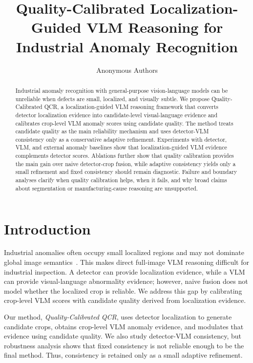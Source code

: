 \documentclass[10pt]{article}
\title{Quality-Calibrated Localization-Guided VLM Reasoning for Industrial Anomaly Recognition}
\author{Anonymous Authors}
\date{}
\begin{document}
\maketitle

\begin{abstract}
Industrial anomaly recognition with general-purpose vision-language models can be unreliable when defects are small, localized, and visually subtle.
We propose Quality-Calibrated QCR, a localization-guided VLM reasoning framework that converts detector localization evidence into candidate-level visual-language evidence and calibrates crop-level VLM anomaly scores using candidate quality.
The method treats candidate quality as the main reliability mechanism and uses detector-VLM consistency only as a conservative adaptive refinement.
Experiments with detector, VLM, and external anomaly baselines show that localization-guided VLM evidence complements detector scores.
Ablations further show that quality calibration provides the main gain over naive detector-crop fusion, while adaptive consistency yields only a small refinement and fixed consistency should remain diagnostic.
Failure and boundary analyses clarify when quality calibration helps, when it fails, and why broad claims about segmentation or manufacturing-cause reasoning are unsupported.
\end{abstract}

\section{Introduction}

Industrial anomalies often occupy small localized regions and may not dominate global image semantics~\cite{Bergmann2019MVTecAD,Zou2022VisA}.
This makes direct full-image VLM reasoning difficult for industrial inspection.
A detector can provide localization evidence, while a VLM can provide visual-language abnormality evidence; however, naive fusion does not model whether the localized crop is reliable.
We address this gap by calibrating crop-level VLM scores with candidate quality derived from localization evidence.

Our method, \emph{Quality-Calibrated QCR}, uses detector localization to generate candidate crops, obtains crop-level VLM anomaly evidence, and modulates that evidence using candidate quality.
We also study detector-VLM consistency, but robustness analysis shows that fixed consistency is not reliable enough to be the final method.
Thus, consistency is retained only as a small adaptive refinement.
\end{document}
